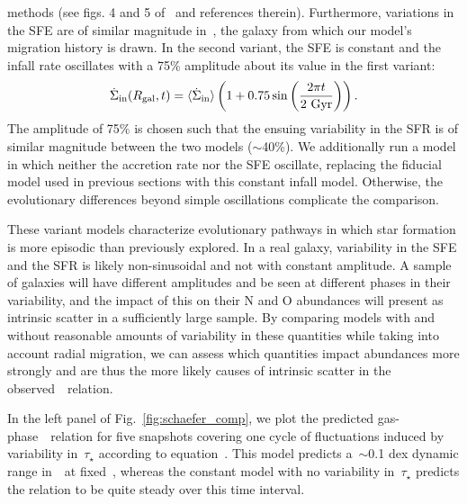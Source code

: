 \documentclass[ms.tex]{subfiles}
\begin{document}
methods (see figs. 4 and 5 of~\citealp{Tacconi2018} and references therein).
Furthermore, variations in the SFE are of similar magnitude in~\hsim, the
galaxy from which our model's migration history is drawn.
In the second variant, the SFE is constant and the infall rate oscillates with
a 75\% amplitude about its value in the first variant:
\begin{equation}
\dot{\Sigma}_\text{in}(R_\text{gal}, t) = \langle\dot{\Sigma}_\text{in}\rangle
\left(1 + 0.75\sin\left(\frac{2\pi t}{2~\text{Gyr}}\right)\right).
\label{eq:ifr_var}
\end{equation}
The amplitude of 75\% is chosen such that the ensuing variability in the SFR is
of similar magnitude between the two models ($\sim$40\%).
We additionally run a model in which neither the accretion rate nor the SFE
oscillate, replacing the fiducial model used in previous sections with this
constant infall model.
Otherwise, the evolutionary differences beyond simple oscillations complicate
the comparison.
\par
These variant models characterize evolutionary pathways in which star formation
is more episodic than previously explored.
In a real galaxy, variability in the SFE and the SFR is likely non-sinusoidal
and not with constant amplitude.
A sample of galaxies will have different amplitudes and be seen at different
phases in their variability, and the impact of this on their N and O abundances
will present as intrinsic scatter in a sufficiently large sample.
By comparing models with and without reasonable amounts of variability in these
quantities while taking into account radial migration, we can assess which
quantities impact abundances more strongly and are thus the more likely causes
of intrinsic scatter in the observed~\ohno~relation.
\par
In the left panel of Fig.~\ref{fig:schaefer_comp}, we plot the predicted
gas-phase~\ohno~relation for five snapshots covering one cycle of fluctuations
induced by variability in~$\tau_\star$ according to equation~.
This model predicts a~$\sim$0.1 dex dynamic range in~\no~at fixed~\oh, whereas
the constant model with no variability in~$\tau_\star$ predicts the relation
to be quite steady over this time interval.
\end{document}
